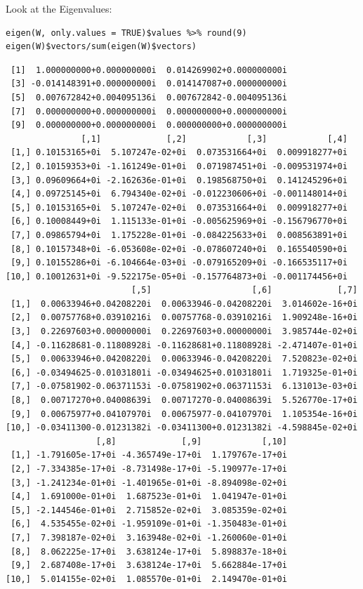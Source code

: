\documentclass[11pt]{article}
\begin{document}
Look at the Eigenvalues:
\begin{verbatim}
eigen(W, only.values = TRUE)$values %>% round(9)
eigen(W)$vectors/sum(eigen(W)$vectors)
\end{verbatim}

\begin{verbatim}
 [1]  1.000000000+0.000000000i  0.014269902+0.000000000i
 [3] -0.014148391+0.000000000i  0.014147087+0.000000000i
 [5]  0.007672842+0.004095136i  0.007672842-0.004095136i
 [7]  0.000000000+0.000000000i  0.000000000+0.000000000i
 [9]  0.000000000+0.000000000i  0.000000000+0.000000000i
               [,1]             [,2]            [,3]            [,4]
 [1,] 0.10153165+0i  5.107247e-02+0i  0.073531664+0i  0.009918277+0i
 [2,] 0.10159353+0i -1.161249e-01+0i  0.071987451+0i -0.009531974+0i
 [3,] 0.09609664+0i -2.162636e-01+0i  0.198568750+0i  0.141245296+0i
 [4,] 0.09725145+0i  6.794340e-02+0i -0.012230606+0i -0.001148014+0i
 [5,] 0.10153165+0i  5.107247e-02+0i  0.073531664+0i  0.009918277+0i
 [6,] 0.10008449+0i  1.115133e-01+0i -0.005625969+0i -0.156796770+0i
 [7,] 0.09865794+0i  1.175228e-01+0i -0.084225633+0i  0.008563891+0i
 [8,] 0.10157348+0i -6.053608e-02+0i -0.078607240+0i  0.165540590+0i
 [9,] 0.10155286+0i -6.104664e-03+0i -0.079165209+0i -0.166535117+0i
[10,] 0.10012631+0i -9.522175e-05+0i -0.157764873+0i -0.001174456+0i
                         [,5]                    [,6]             [,7]
 [1,]  0.00633946+0.04208220i  0.00633946-0.04208220i  3.014602e-16+0i
 [2,]  0.00757768+0.03910216i  0.00757768-0.03910216i  1.909248e-16+0i
 [3,]  0.22697603+0.00000000i  0.22697603+0.00000000i  3.985744e-02+0i
 [4,] -0.11628681-0.11808928i -0.11628681+0.11808928i -2.471407e-01+0i
 [5,]  0.00633946+0.04208220i  0.00633946-0.04208220i  7.520823e-02+0i
 [6,] -0.03494625-0.01031801i -0.03494625+0.01031801i  1.719325e-01+0i
 [7,] -0.07581902-0.06371153i -0.07581902+0.06371153i  6.131013e-03+0i
 [8,]  0.00717270+0.04008639i  0.00717270-0.04008639i  5.526770e-17+0i
 [9,]  0.00675977+0.04107970i  0.00675977-0.04107970i  1.105354e-16+0i
[10,] -0.03411300-0.01231382i -0.03411300+0.01231382i -4.598845e-02+0i
                  [,8]             [,9]            [,10]
 [1,] -1.791605e-17+0i -4.365749e-17+0i  1.179767e-17+0i
 [2,] -7.334385e-17+0i -8.731498e-17+0i -5.190977e-17+0i
 [3,] -1.241234e-01+0i -1.401965e-01+0i -8.894098e-02+0i
 [4,]  1.691000e-01+0i  1.687523e-01+0i  1.041947e-01+0i
 [5,] -2.144546e-01+0i  2.715852e-02+0i  3.085359e-02+0i
 [6,]  4.535455e-02+0i -1.959109e-01+0i -1.350483e-01+0i
 [7,]  7.398187e-02+0i  3.163948e-02+0i -1.260060e-01+0i
 [8,]  8.062225e-17+0i  3.638124e-17+0i  5.898837e-18+0i
 [9,]  2.687408e-17+0i  3.638124e-17+0i  5.662884e-17+0i
[10,]  5.014155e-02+0i  1.085570e-01+0i  2.149470e-01+0i
\end{verbatim}
\end{document}
